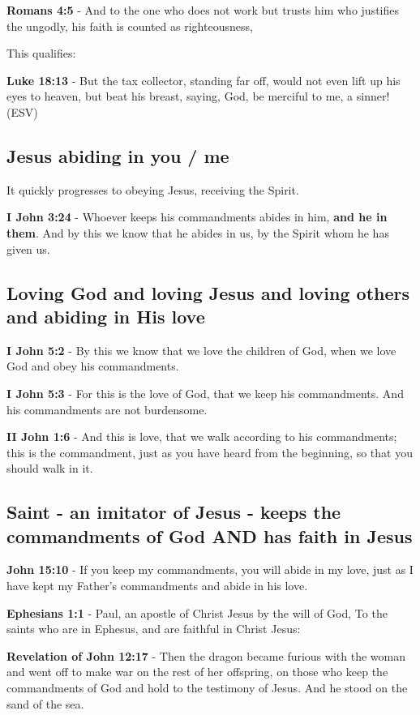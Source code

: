 \documentclass[11pt]{article}
\begin{document}
\textbf{Romans 4:5} - And to the one who does not work but trusts him who justifies the ungodly, his faith is counted as righteousness,

This qualifies:

\textbf{Luke 18:13} - But the tax collector, standing far off, would not even lift up his eyes to heaven, but beat his breast, saying, God, be merciful to me, a sinner! (ESV)

\subsection{Jesus abiding in \textbf{you} / \textbf{me}}
\label{sec:org4def2e7}
It quickly progresses to obeying Jesus, receiving the Spirit.

\textbf{I John 3:24} - Whoever keeps his commandments abides in him, \textbf{and he in them}. And by this we know that he abides in us, by the Spirit whom he has given us.

\subsection{Loving God and loving Jesus and loving others and abiding in His love}
\label{sec:orge592c4d}
\textbf{I John 5:2} - By this we know that we love the children of God, when we love God and obey his commandments.

\textbf{I John 5:3} - For this is the love of God, that we keep his commandments. And his commandments are not burdensome.

\textbf{II John 1:6} - And this is love, that we walk according to his commandments; this is the commandment, just as you have heard from the beginning, so that you should walk in it.

\subsection{Saint - an imitator of Jesus - keeps the commandments of God AND has faith in Jesus}
\label{sec:orgab16906}
\textbf{John 15:10} - If you keep my commandments, you will abide in my love, just as I have kept my Father's commandments and abide in his love.

\textbf{Ephesians 1:1} - Paul, an apostle of Christ Jesus by the will of God, To the saints who are in Ephesus, and are faithful in Christ Jesus:

\textbf{Revelation of John 12:17} - Then the dragon became furious with the woman and went off to make war on the rest of her offspring, on those who keep the commandments of God and hold to the testimony of Jesus. And he stood on the sand of the sea.
\end{document}
